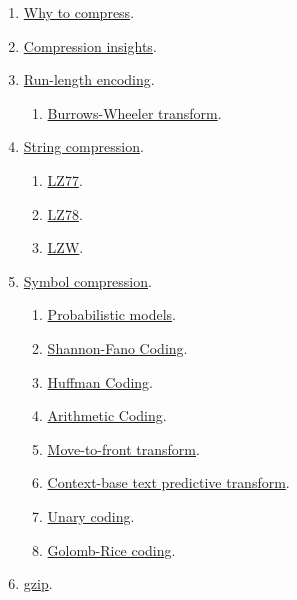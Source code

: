   \begin{enumerate}
  \item \href{https://cdn.rawgit.com/vicente-gonzalez-ruiz/why_to_compress/master/index.html}{Why to compress}.
  \item \href{https://cdn.rawgit.com/vicente-gonzalez-ruiz/compression_insights/master/index.html}{Compression insights}.
  \item \href{https://cdn.rawgit.com/vicente-gonzalez-ruiz/Run-length_encoding/master/index.html}{Run-length encoding}.
  \begin{enumerate}
  \item \href{https://cdn.rawgit.com/vicente-gonzalez-ruiz/Burrows-Wheeler_transform/master/index.html}{Burrows-Wheeler transform}.
  \end{enumerate}
\item \href{https://cdn.rawgit.com/vicente-gonzalez-ruiz/string_compression/master/index.html}{String compression}.
  \begin{enumerate}
  \item \href{https://cdn.rawgit.com/vicente-gonzalez-ruiz/LZ77/master/index.html}{LZ77}.
  \item \href{https://cdn.rawgit.com/vicente-gonzalez-ruiz/LZ78/master/index.html}{LZ78}.
  \item \href{https://cdn.rawgit.com/vicente-gonzalez-ruiz/LZW/master/index.html}{LZW}.
  \end{enumerate}
\item \href{https://cdn.rawgit.com/vicente-gonzalez-ruiz/symbol_compression/master/index.htm}{Symbol compression}.
  \begin{enumerate}
  \item \href{https://cdn.rawgit.com/vicente-gonzalez-ruiz/probabilistic_models/master/index.html}{Probabilistic models}.
  \item \href{https://cdn.rawgit.com/vicente-gonzalez-ruiz/Shannon-Fano_coding/master/index.html}{Shannon-Fano Coding}.
  \item \href{https://cdn.rawgit.com/vicente-gonzalez-ruiz/Huffman_coding/master/index.html}{Huffman Coding}.
  \item \href{https://cdn.rawgit.com/vicente-gonzalez-ruiz/arithmetic_coding/master/index.html}{Arithmetic Coding}.
  \item \href{https://cdn.rawgit.com/vicente-gonzalez-ruiz/move-to-front_transform/master/index.html}{Move-to-front transform}.
  \item \href{https://cdn.rawgit.com/vicente-gonzalez-ruiz/context-based_text_predictive_transform/master/index.html}{Context-base text predictive transform}.
  \item \href{https://cdn.rawgit.com/vicente-gonzalez-ruiz/unary_coding/master/index.html}{Unary coding}.
  \item \href{https://cdn.rawgit.com/vicente-gonzalez-ruiz/Golomb-Rice_coding/master/index.html}{Golomb-Rice coding}.
  \end{enumerate}
\item \href{https://cdn.rawgit.com/vicente-gonzalez-ruiz/gzip/master/index.html}{gzip}.
  \end{enumerate}


